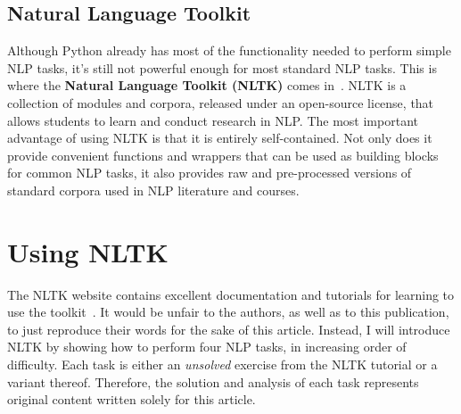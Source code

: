 \documentclass[11pt]{article}
\begin{document}
\subsection{Natural Language Toolkit}\label{sub:natural_language_toolkit} %
Although Python already has most of the functionality needed to perform simple NLP tasks, it's still not powerful enough for most standard NLP tasks. This is where the \textbf{Natural Language Toolkit (NLTK)} comes in~\cite{nltk}. NLTK is a collection of modules and corpora, released under an open-source license, that allows students to learn and conduct research in NLP.
The most important advantage of using NLTK is that it is entirely self-contained. Not only does it provide convenient functions and wrappers that can be used as building blocks for common NLP tasks, it also provides raw and pre-processed versions of standard corpora used in NLP literature and courses.

\section{Using NLTK}\label{sec:using_nltk} %
The NLTK website contains excellent documentation and tutorials for learning to use the toolkit~\cite{nltktut}. It would be unfair to the authors, as well as to this publication, to just reproduce their words for the sake of this article. Instead, I will introduce NLTK by showing how to perform four NLP tasks, in increasing order of difficulty. Each task is either an \emph{unsolved} exercise from the NLTK tutorial or a variant thereof. Therefore, the solution and analysis of each task represents original content written solely for this article.
\end{document}
